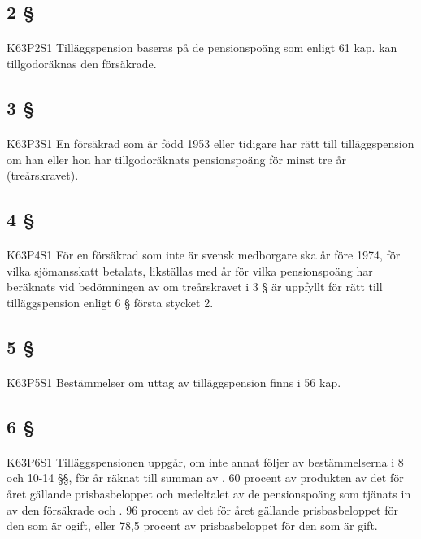 \documentclass[a4paper,notitlepage,openany,10pt]{book}
\begin{document}
\subsection*{2 §}
\paragraph*{}
{\tiny K63P2S1}
Tilläggspension baseras på de pensionspoäng som enligt 61 kap. kan tillgodoräknas den försäkrade.
\subsection*{3 §}
\paragraph*{}
{\tiny K63P3S1}
En försäkrad som är född 1953 eller tidigare har rätt till tilläggspension om han eller hon har tillgodoräknats pensionspoäng för minst tre år (treårskravet).
\subsection*{4 §}
\paragraph*{}
{\tiny K63P4S1}
För en försäkrad som inte är svensk medborgare ska år före 1974, för vilka sjömansskatt betalats, likställas med år för vilka pensionspoäng har beräknats vid bedömningen av om treårskravet i 3 § är uppfyllt för rätt till tilläggspension enligt 6 § första stycket 2.
\subsection*{5 §}
\paragraph*{}
{\tiny K63P5S1}
Bestämmelser om uttag av tilläggspension finns i 56 kap.
\subsection*{6 §}
\paragraph*{}
{\tiny K63P6S1}
Tilläggspensionen uppgår, om inte annat följer av bestämmelserna i 8 och 10-14 §§, för år räknat till summan av
. 60 procent av produkten av det för året gällande prisbasbeloppet och medeltalet av de pensionspoäng som tjänats in av den försäkrade och
. 96 procent av det för året gällande prisbasbeloppet för den som är ogift, eller 78,5 procent av prisbasbeloppet för den som är gift.
\end{document}
